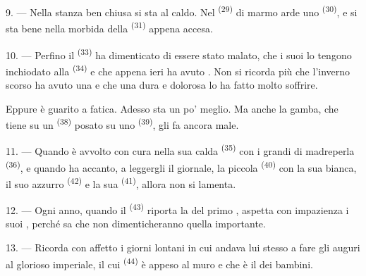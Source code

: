 9. --- Nella stanza ben chiusa si sta al caldo. Nel 
\textsuperscript{(29)} di marmo arde uno 
\textsuperscript{(30)}, e si sta bene nella  morbida della
 \textsuperscript{(31)} appena accesa.

\VUsaut{4.2mm}
\VUsaut{3.0mm}

10. --- Perfino il  \textsuperscript{(33)} ha dimenticato di essere stato
malato, che i suoi  lo tengono inchiodato alla 
\textsuperscript{(34)} e che appena ieri ha avuto . Non
si ricorda più che l'inverno scorso ha avuto una  e che una
 dura e dolorosa lo ha fatto molto soffrire.

Eppure è guarito a fatica. Adesso sta un po' meglio. Ma anche la gamba, che tiene su
un  \textsuperscript{(38)} posato su uno 
\textsuperscript{(39)}, gli fa ancora male.

11. --- Quando è avvolto con cura nella sua calda 
\textsuperscript{(35)} con i grandi  di madreperla
\textsuperscript{(36)}, e quando ha accanto, a leggergli il giornale, la piccola
 \textsuperscript{(40)} con la sua  bianca, il suo
 azzurro \textsuperscript{(42)} e la sua 
\textsuperscript{(41)}, allora non si lamenta.

12. --- Ogni anno, quando il  \textsuperscript{(43)} riporta la
 del primo , aspetta con impazienza i suoi
, perché sa che non dimenticheranno quella  importante.

13. --- Ricorda con affetto i giorni lontani in cui andava lui stesso a fare gli auguri
al glorioso  imperiale, il cui 
\textsuperscript{(44)} è appeso al muro e che è il  dei bambini.
\VUsaut{6.0mm}
\VUfilet{22mm}
